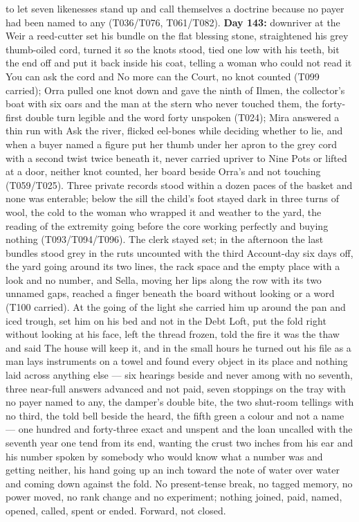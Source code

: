 \documentclass{design/chronicle}
\begin{document}
{\begin{itemize}[leftmargin=1.4em,itemsep=1pt,topsep=3pt,parsep=0pt]
to let seven likenesses stand up and call themselves a doctrine because no payer had been named to any (T036/T076, T061/T082). \textbf{Day 143:} downriver at the Weir a reed-cutter set his bundle on the flat blessing stone, straightened his grey thumb-oiled cord, turned it so the knots stood, tied one low with his teeth, bit the end off and put it back inside his coat, telling a woman who could not read it You can ask the cord and No more can the Court, no knot counted (T099 carried); Orra pulled one knot down and gave the ninth of Ilmen, the collector’s boat with six oars and the man at the stern who never touched them, the forty-first double turn legible and the word forty unspoken (T024); Mira answered a thin run with Ask the river, flicked eel-bones while deciding whether to lie, and when a buyer named a figure put her thumb under her apron to the grey cord with a second twist twice beneath it, never carried upriver to Nine Pots or lifted at a door, neither knot counted, her board beside Orra’s and not touching (T059/T025). Three private records stood within a dozen paces of the basket and none was enterable; below the sill the child’s foot stayed dark in three turns of wool, the cold to the woman who wrapped it and weather to the yard, the reading of the extremity going before the core working perfectly and buying nothing (T093/T094/T096). The clerk stayed set; in the afternoon the last bundles stood grey in the ruts uncounted with the third Account-day six days off, the yard going around its two lines, the rack space and the empty place with a look and no number, and Sella, moving her lips along the row with its two unnamed gaps, reached a finger beneath the board without looking or a word (T100 carried). At the going of the light she carried him up around the pan and iced trough, set him on his bed and not in the Debt Loft, put the fold right without looking at his face, left the thread frozen, told the fire it was the thaw and said The house will keep it, and in the small hours he turned out his file as a man lays instruments on a towel and found every object in its place and nothing laid across anything else — six hearings beside and never among with no seventh, three near-full answers advanced and not paid, seven stoppings on the tray with no payer named to any, the damper’s double bite, the two shut-room tellings with no third, the told bell beside the heard, the fifth green a colour and not a name — one hundred and forty-three exact and unspent and the loan uncalled with the seventh year one tend from its end, wanting the crust two inches from his ear and his number spoken by somebody who would know what a number was and getting neither, his hand going up an inch toward the note of water over water and coming down against the fold. No present-tense break, no tagged memory, no power moved, no rank change and no experiment; nothing joined, paid, named, opened, called, spent or ended. Forward, not closed.


\end{itemize}}
\end{document}
